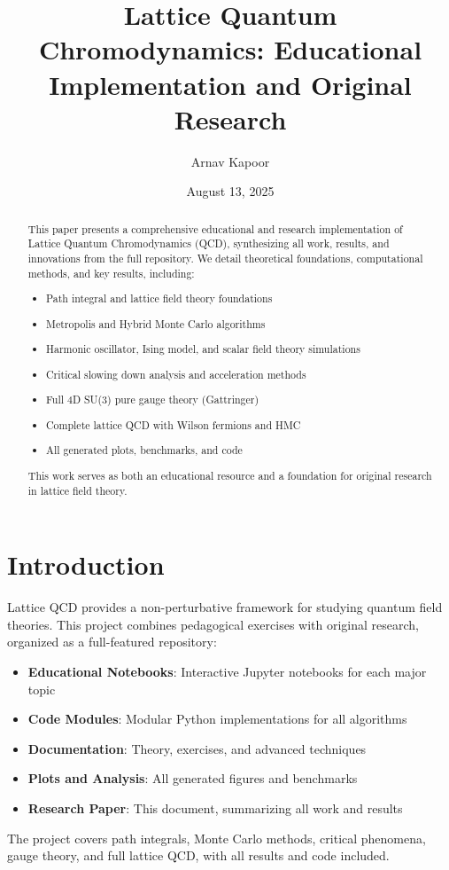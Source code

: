 \documentclass[12pt]{article}
\title{Lattice Quantum Chromodynamics: Educational Implementation and Original Research}
\author{Arnav Kapoor}
\date{August 13, 2025}
\begin{document}
\maketitle

\begin{abstract}
This paper presents a comprehensive educational and research implementation of Lattice Quantum Chromodynamics (QCD), synthesizing all work, results, and innovations from the full repository. We detail theoretical foundations, computational methods, and key results, including:
\begin{itemize}
    \item Path integral and lattice field theory foundations
    \item Metropolis and Hybrid Monte Carlo algorithms
    \item Harmonic oscillator, Ising model, and scalar field theory simulations
    \item Critical slowing down analysis and acceleration methods
    \item Full 4D SU(3) pure gauge theory (Gattringer)
    \item Complete lattice QCD with Wilson fermions and HMC
    \item All generated plots, benchmarks, and code
\end{itemize}
This work serves as both an educational resource and a foundation for original research in lattice field theory.
\end{abstract}

\section{Introduction}
Lattice QCD provides a non-perturbative framework for studying quantum field theories. This project combines pedagogical exercises with original research, organized as a full-featured repository:
\begin{itemize}
    \item \textbf{Educational Notebooks}: Interactive Jupyter notebooks for each major topic
    \item \textbf{Code Modules}: Modular Python implementations for all algorithms
    \item \textbf{Documentation}: Theory, exercises, and advanced techniques
    \item \textbf{Plots and Analysis}: All generated figures and benchmarks
    \item \textbf{Research Paper}: This document, summarizing all work and results
\end{itemize}
The project covers path integrals, Monte Carlo methods, critical phenomena, gauge theory, and full lattice QCD, with all results and code included.
\end{document}
